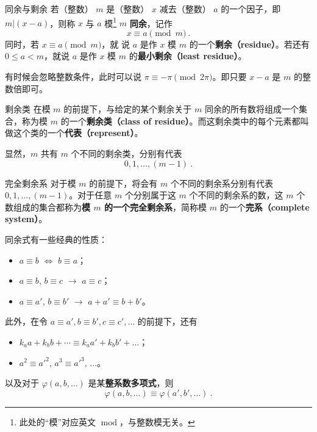 

\begin{definition}{同余与剩余}
若（整数） $m$ 是（整数） $x$ 减去（整数） $a$ 的一个因子，即 $m | (x-a)$，则称 $x$ 与 $a$ 模\footnote{此处的“模”对应英文 $\operatorname{mod}$，与整数模无关。} $m$ \textbf{同余}，记作
\begin{equation}
x \equiv a \pmod m ~.
\end{equation}
同时，若 $x \equiv a \pmod m$，就 说 $a$ 是作 $x$ 模 $m$ 的一个\textbf{剩余（residue）}。若还有 $0 \le a < m$，就说 $a$ 是作 $x$ 模 $m$ 的\textbf{最小剩余（least residue）}。
\end{definition}
有时候会忽略整数条件，此时可以说 $\pi \equiv -\pi \pmod{2\pi}$。即只要 $x-a$ 是 $m$ 的整数倍即可。

\begin{definition}{剩余类}
在模 $m$ 的前提下，与给定的某个剩余关于 $m$ 同余的所有数将组成一个集合，称为模 $m$ 的一个\textbf{剩余类（class of residue）}。而这剩余类中的每个元素都叫做这个类的一个\textbf{代表（represent）}。
\end{definition}

\begin{corollary}{}
显然，$m$ 共有 $m$ 个不同的剩余类，分别有代表
\begin{equation}
0, 1, \dots, (m-1) ~.
\end{equation}
\end{corollary}
\begin{definition}{完全剩余系}
对于模 $m$ 的前提下，将会有 $m$ 个不同的剩余系分别有代表 $0, 1, \dots, (m-1)$。对于任意 $m$ 个分别属于这 $m$ 个不同的剩余系的数，这 $m$ 个数组成的集合都称为\textbf{模 $m$ 的一个完全剩余系}，简称模 $m$ 的一个\textbf{完系（complete system）}。
\end{definition}

同余式有一些经典的性质：
\begin{itemize}
\item $a \equiv b$ $\Leftrightarrow$ $b \equiv a$；
\item $a \equiv b$, $b \equiv c$ $\rightarrow$ $a \equiv c$；
\item $a \equiv a'$, $b \equiv b'$ $\rightarrow$ $a + a' \equiv b + b'$。
\end{itemize}
此外，在令 $a \equiv a', b \equiv b', c \equiv c', \dots$ 的前提下，还有
\begin{itemize}
\item $k_a a + k_b b + \cdots \equiv k_a a' + k_b b' + \dots$；
\item $a^2 \equiv a'^2$, $a^3 \equiv a'^3$, $\dots$。
\end{itemize}
以及对于 $\varphi(a, b, \dots)$ 是某\textbf{整系数多项式}，则
$$\varphi(a, b, \dots) \equiv \varphi(a', b', \dots) ~.$$
